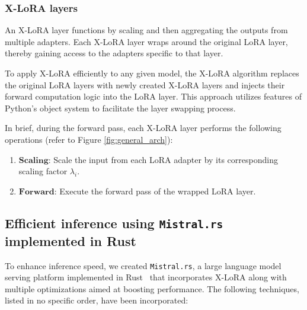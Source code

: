 \subsubsection{X-LoRA layers} An X-LoRA layer functions by scaling and then aggregating the outputs from multiple adapters. Each X-LoRA layer wraps around the original LoRA layer, thereby gaining access to the adapters specific to that layer.

To apply X-LoRA efficiently to any given model, the X-LoRA algorithm replaces the original LoRA layers with newly created X-LoRA layers and injects their forward computation logic into the LoRA layer. This approach utilizes features of Python’s object system to facilitate the layer swapping process.

In brief, during the forward pass, each X-LoRA layer performs the following operations (refer to Figure \ref{fig:general_arch}):

\begin{enumerate}
    \item $\mathbf{Scaling}$: Scale the input from each LoRA adapter by its corresponding scaling factor $\lambda_i$.
    \item $\mathbf{Forward}$: Execute the forward pass of the wrapped LoRA layer.
\end{enumerate}

\subsection{Efficient inference using \texttt{Mistral.rs} implemented in Rust} To enhance inference speed, we created \texttt{Mistral.rs}, a large language model serving platform implemented in Rust~\cite{matsakis2014rust} that incorporates X-LoRA along with multiple optimizations aimed at boosting performance. The following techniques, listed in no specific order, have been incorporated:

